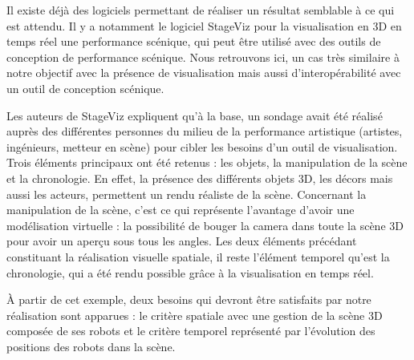 Il existe déjà des logiciels permettant de réaliser un résultat semblable à ce qui est attendu. Il y a notamment le logiciel StageViz pour la visualisation en 3D en temps réel une performance scénique, qui peut être utilisé avec des outils de conception de performance scénique. Nous retrouvons ici, un cas très similaire à notre objectif avec la présence de visualisation mais aussi d'interopérabilité avec un outil de conception scénique.

Les auteurs de StageViz expliquent qu'à la base, un sondage avait été réalisé auprès des différentes personnes du milieu de la performance artistique (artistes, ingénieurs, metteur en scène) pour cibler les besoins d'un outil de visualisation. Trois éléments principaux ont été retenus : les objets, la manipulation de la scène et la chronologie. En effet, la présence des différents objets 3D, les décors mais aussi les acteurs, permettent un rendu réaliste de la scène. Concernant la manipulation de la scène, c'est ce qui représente l'avantage d'avoir une modélisation virtuelle : la possibilité de bouger la camera dans toute la scène 3D pour avoir un aperçu sous tous les angles. Les deux éléments précédant constituant la réalisation visuelle spatiale, il reste l'élément temporel qu'est la chronologie, qui a été rendu possible grâce à la visualisation en temps réel.

À partir de cet exemple, deux besoins qui devront être satisfaits par notre réalisation sont apparues : le critère spatiale avec une gestion de la scène 3D composée de ses robots et le critère temporel représenté par l'évolution des positions des robots dans la scène.


%	
%
%
%
%
